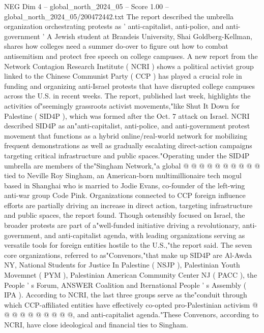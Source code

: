 \begin{textsample}{NEG Dim 4 – global\_north\_2024\_05 – Score 1.00 – global\_north\_2024\_05/200472442.txt}  \label{ex:f4_neg_119}
The report described the umbrella organization orchestrating protests as ' anti-capitalist, anti-police, and anti-government ' A Jewish student at Brandeis University, Shai Goldberg-Kellman, shares how colleges need a summer do-over to figure out how to combat antisemitism and protect free speech on college campuses.
A new report from the Network Contagion Research Institute ( NCRI ) shows a political activist group linked to the Chinese Communist Party ( CCP ) has played a crucial role in funding and organizing anti-Israel protests that have disrupted college campuses across the U.S. in recent weeks.
The report, published last week, highlights the activities of"seemingly grassroots activist movements,"like Shut It Down for Palestine ( SID4P ), which was formed after the Oct. 7 attack on Israel.
NCRI described SID4P as an"anti-capitalist, anti-police, and anti-government protest movement that functions as a hybrid online/real-world network for mobilizing frequent demonstrations as well as gradually escalating direct-action campaigns targeting critical infrastructure and public spaces."Operating under the SID4P umbrella are members of the"Singham Network,"a global @ @ @ @ @ @ @ @ @ @ tied to Neville Roy Singham, an American-born multimillionaire tech mogul based in Shanghai who is married to Jodie Evans, co-founder of the left-wing anti-war group Code Pink.
Organizations connected to CCP foreign influence efforts are partially driving an increase in direct action, targeting infrastructure and public spaces, the report found.
Though ostensibly focused on Israel, the broader protests are part of a"well-funded initiative driving a revolutionary, anti-government, and anti-capitalist agenda, with leading organizations serving as versatile tools for foreign entities hostile to the U.S.,"the report said.
The seven core organizations, referred to as"Convenors,"that make up SID4P are Al-Awda NY, National Students for Justice In Palestine ( NSJP ), Palestinian Youth Movemnet ( PYM ), Palestinian American Community Center NJ ( PACC ), the People ' s Forum, ANSWER Coalition and Iternational People ' s Assembly ( IPA ).
According to NCRI, the last three groups serve as the"conduit through which CCP-affiliated entities have effectively co-opted pro-Palestinian activism @ @ @ @ @ @ @ @ @ @, and anti-capitalist agenda."These Convenors, according to NCRI, have close ideological and financial ties to Singham.

\end{textsample}
